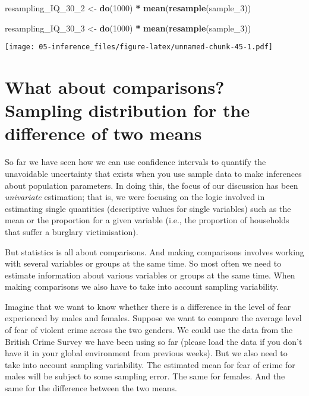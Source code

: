 \documentclass[
]{book}
\newenvironment{Shaded}{\begin{snugshade}}{\end{snugshade}}
\newcommand{\DecValTok}[1]{\textcolor[rgb]{0.00,0.00,0.81}{#1}}
\newcommand{\FunctionTok}[1]{\textcolor[rgb]{0.13,0.29,0.53}{\textbf{#1}}}
\newcommand{\NormalTok}[1]{#1}
\newcommand{\OtherTok}[1]{\textcolor[rgb]{0.56,0.35,0.01}{#1}}
\newcommand{\SpecialCharTok}[1]{\textcolor[rgb]{0.81,0.36,0.00}{\textbf{#1}}}
\begin{document}
\begin{Shaded}
\begin{Highlighting}[]
\NormalTok{resampling\_IQ\_30\_2 }\OtherTok{\textless{}{-}} \FunctionTok{do}\NormalTok{(}\DecValTok{1000}\NormalTok{) }\SpecialCharTok{*} \FunctionTok{mean}\NormalTok{(}\FunctionTok{resample}\NormalTok{(sample\_3))}
\end{Highlighting}
\end{Shaded}

\begin{Shaded}
\begin{Highlighting}[]
\NormalTok{resampling\_IQ\_30\_3 }\OtherTok{\textless{}{-}} \FunctionTok{do}\NormalTok{(}\DecValTok{1000}\NormalTok{) }\SpecialCharTok{*} \FunctionTok{mean}\NormalTok{(}\FunctionTok{resample}\NormalTok{(sample\_3))}
\end{Highlighting}
\end{Shaded}

\texttt{[image: 05-inference\_files/figure-latex/unnamed-chunk-45-1.pdf]}

\section{What about comparisons? Sampling distribution for the difference of two means}\label{what-about-comparisons-sampling-distribution-for-the-difference-of-two-means}

So far we have seen how we can use confidence intervals to quantify the unavoidable uncertainty that exists when you use sample data to make inferences about population parameters. In doing this, the focus of our discussion has been \emph{univariate} estimation; that is, we were focusing on the logic involved in estimating single quantities (descriptive values for single variables) such as the mean or the proportion for a given variable (i.e., the proportion of households that suffer a burglary victimisation).

But statistics is all about comparisons. And making comparisons involves working with several variables or groups at the same time. So most often we need to estimate information about various variables or groups at the same time. When making comparisons we also have to take into account sampling variability.

Imagine that we want to know whether there is a difference in the level of fear experienced by males and females. Suppose we want to compare the average level of fear of violent crime across the two genders. We could use the data from the British Crime Survey we have been using so far (please load the data if you don't have it in your global environment from previous weeks). But we also need to take into account sampling variability. The estimated mean for fear of crime for males will be subject to some sampling error. The same for females. And the same for the difference between the two means.
\end{document}
